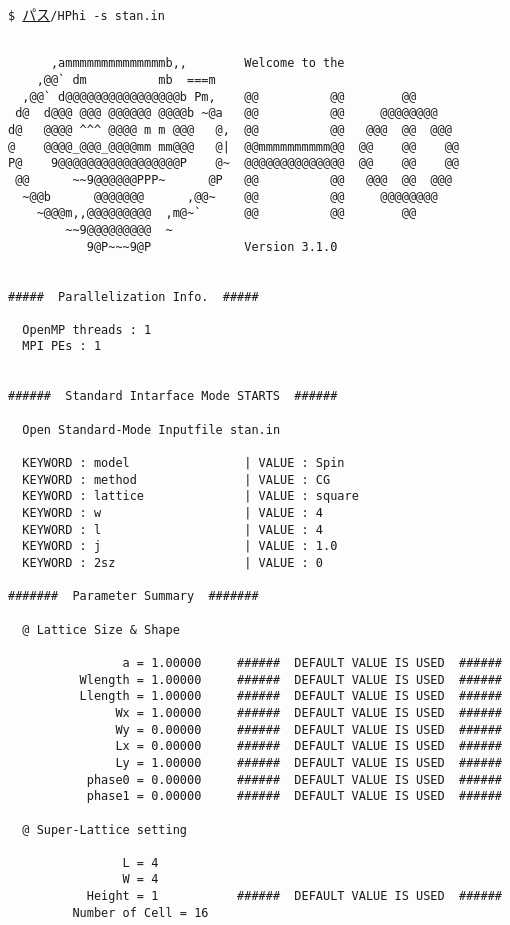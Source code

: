 \vspace{1cm}\hspace{-0.7cm}
\verb|$ |\underline{パス}\verb|/HPhi -s stan.in|
\small
\begin{verbatim}

      ,ammmmmmmmmmmmmmb,,        Welcome to the
    ,@@` dm          mb  ===m
  ,@@` d@@@@@@@@@@@@@@@@b Pm,    @@          @@        @@
 d@  d@@@ @@@ @@@@@@ @@@@b ~@a   @@          @@     @@@@@@@@
d@   @@@@ ^^^ @@@@ m m @@@   @,  @@          @@   @@@  @@  @@@
@    @@@@_@@@_@@@@mm mm@@@   @|  @@mmmmmmmmmm@@  @@    @@    @@
P@    9@@@@@@@@@@@@@@@@@P    @~  @@@@@@@@@@@@@@  @@    @@    @@
 @@      ~~9@@@@@@PPP~      @P   @@          @@   @@@  @@  @@@
  ~@@b      @@@@@@@      ,@@~    @@          @@     @@@@@@@@
    ~@@@m,,@@@@@@@@@  ,m@~`      @@          @@        @@
        ~~9@@@@@@@@@  ~
           9@P~~~9@P             Version 3.1.0


#####  Parallelization Info.  #####

  OpenMP threads : 1
  MPI PEs : 1


######  Standard Intarface Mode STARTS  ######

  Open Standard-Mode Inputfile stan.in

  KEYWORD : model                | VALUE : Spin
  KEYWORD : method               | VALUE : CG
  KEYWORD : lattice              | VALUE : square
  KEYWORD : w                    | VALUE : 4
  KEYWORD : l                    | VALUE : 4
  KEYWORD : j                    | VALUE : 1.0
  KEYWORD : 2sz                  | VALUE : 0

#######  Parameter Summary  #######

  @ Lattice Size & Shape

                a = 1.00000     ######  DEFAULT VALUE IS USED  ######
          Wlength = 1.00000     ######  DEFAULT VALUE IS USED  ######
          Llength = 1.00000     ######  DEFAULT VALUE IS USED  ######
               Wx = 1.00000     ######  DEFAULT VALUE IS USED  ######
               Wy = 0.00000     ######  DEFAULT VALUE IS USED  ######
               Lx = 0.00000     ######  DEFAULT VALUE IS USED  ######
               Ly = 1.00000     ######  DEFAULT VALUE IS USED  ######
           phase0 = 0.00000     ######  DEFAULT VALUE IS USED  ######
           phase1 = 0.00000     ######  DEFAULT VALUE IS USED  ######

  @ Super-Lattice setting

                L = 4
                W = 4
           Height = 1           ######  DEFAULT VALUE IS USED  ######
         Number of Cell = 16


\end{verbatim}
